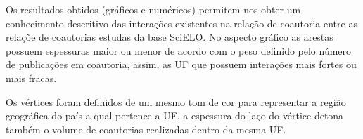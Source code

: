 Os resultados obtidos (gráficos e numéricos) permitem-nos obter um conhecimento descritivo das interações existentes na relação de coautoria entre as relaçõe de coautorias estudas da base SciELO. No aspecto gráfico as arestas possuem espessuras maior ou menor de acordo com o peso definido pelo número de publicações em coautoria, assim, as UF que possuem interações mais fortes ou mais fracas. 

Os vértices foram definidos de um mesmo tom de cor para representar a região geográfica do país a qual pertence a UF, a espessura do laço do vértice detona também o volume de coautorias realizadas dentro da mesma UF.

